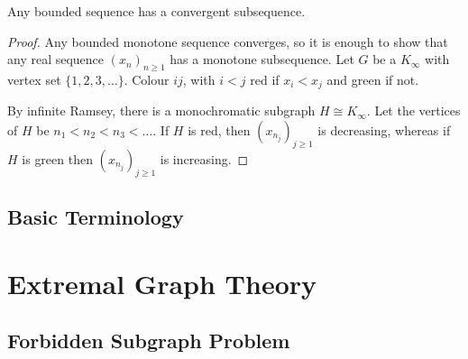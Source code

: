\documentclass{article}
\newcommand{\red}[1]{\textcolor{bred}{#1}}
\newcommand{\green}[1]{\textcolor{bgreen}{#1}}
\begin{document}
\begin{ncor}
    Any bounded sequence has a convergent subsequence.
\end{ncor}
\begin{proof}
    Any bounded monotone sequence converges, so it is enough to show that any real sequence $(x_n)_{n \geq 1}$ has a monotone subsequence.
    Let $G$ be a $K_\infty$ with vertex set $\{1, 2, 3, \dotsc\}$. Colour $ij$, with $i<j$ \red{red} if $x_i < x_j$ and \green{green} if not.

    By infinite Ramsey, there is a monochromatic subgraph $H \cong K_\infty$. Let the vertices of $H$ be $n_1 < n_2 < n_3 < \dots$.
    If $H$ is \red{red}, then $(x_{n_j})_{j \geq 1}$ is decreasing, whereas if $H$ is \green{green} then $(x_{n_j})_{j \geq 1}$ is increasing.
\end{proof}
\subsection{Basic Terminology}





























\clearpage
\section{Extremal Graph Theory}



























\subsection{Forbidden Subgraph Problem}
\end{document}
